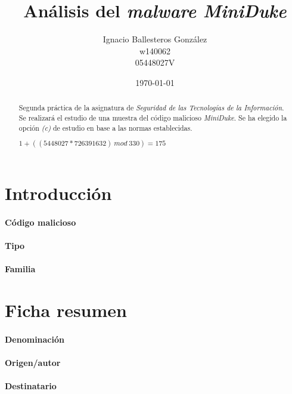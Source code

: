 \documentclass[11pt,a4paper]{article}
\title{Análisis del \emph{malware MiniDuke}}
\author{\begin{tabular}[center]{c}
          Ignacio Ballesteros González \\
          \small w140062 \\
          \small 05448027V \\
        \end{tabular}
      }
\date{\today}
\begin{document}
\maketitle
\tableofcontents
\normalsize
\begin{abstract}
  Segunda práctica de la asignatura de \emph{Seguridad de las
    Tecnologías de la Información}. Se realizará el estudio de una
  muestra del código malicioso \emph{MiniDuke}. Se ha elegido la
  opción \textit{(c)} de estudio en base a las normas establecidas.

  \begin{center}
    $1 + ((5448027 * 726391632)~mod~330) = 175$
  \end{center}
\end{abstract}

\section{Introducción}
\label{sec:intro}

\paragraph{Código malicioso}

\paragraph{Tipo}

\paragraph{Familia}

\section{Ficha resumen}
\label{sec:resumen}

\paragraph{Denominación}

\paragraph{Origen/autor}

\paragraph{Destinatario}
\end{document}
